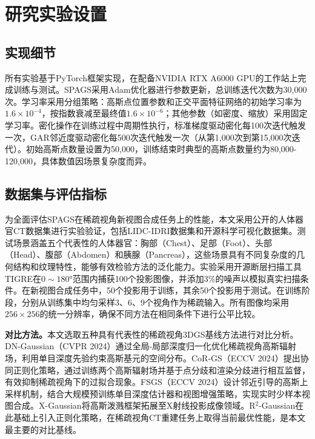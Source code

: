 \section{研究实验设置}

\subsection{实现细节}

所有实验基于PyTorch框架\cite{paszke2019pytorch}实现，在配备NVIDIA RTX A6000 GPU的工作站上完成训练与测试。SPAGS采用Adam优化器进行参数更新，总训练迭代次数为30,000次。学习率采用分组策略：高斯点位置参数和正交平面特征网络的初始学习率为$1.6 \times 10^{-4}$，按指数衰减至最终值$1.6 \times 10^{-6}$；其他参数（如密度、缩放）采用固定学习率。密化操作在训练过程中周期性执行，标准梯度驱动密化每100次迭代触发一次，GAR邻近度驱动密化每500次迭代触发一次（从第1,000次到第15,000次迭代）。初始高斯点数量设置为50,000，训练结束时典型的高斯点数量约为80,000-120,000，具体数值因场景复杂度而异。

\subsection{数据集与评估指标}

为全面评估SPAGS在稀疏视角新视图合成任务上的性能，本文采用公开的人体器官CT数据集进行实验验证，包括LIDC-IDRI数据集\cite{armato2011lidc}和开源科学可视化数据集\cite{klacansky2022}。测试场景涵盖五个代表性的人体器官：胸部（Chest）、足部（Foot）、头部（Head）、腹部（Abdomen）和胰腺（Pancreas），这些场景具有不同复杂度的几何结构和纹理特性，能够有效检验方法的泛化能力。实验采用开源断层扫描工具TIGRE\cite{biguri2016tigre}在$0\sim180°$范围内捕获100个投影图像，并添加3\%的噪声以模拟真实扫描条件。在新视图合成任务中，50个投影用于训练，其余50个投影用于测试。在训练阶段，分别从训练集中均匀采样3、6、9个视角作为稀疏输入。所有图像均采用$256 \times 256$的统一分辨率，确保不同方法在相同条件下进行公平比较。

\textbf{对比方法。}本文选取五种具有代表性的稀疏视角3DGS基线方法进行对比分析。DN-Gaussian\cite{li2024dngaussian}（CVPR 2024）通过全局-局部深度归一化优化稀疏视角高斯辐射场，利用单目深度先验约束高斯基元的空间分布。CoR-GS\cite{zhang2024cor}（ECCV 2024）提出协同正则化策略，通过训练两个高斯辐射场并基于点分歧和渲染分歧进行相互监督，有效抑制稀疏视角下的过拟合现象。FSGS\cite{FSGS}（ECCV 2024）设计邻近引导的高斯上采样机制，结合大规模预训练单目深度估计器和视图增强策略，实现实时少样本视图合成。X-Gaussian\cite{xgaussian}将高斯泼溅框架拓展至X射线投影成像领域。R$^2$-Gaussian\cite{r2gaussian}在此基础上引入正则化策略，在稀疏视角CT重建任务上取得当前最优性能，是本文最主要的对比基线。

